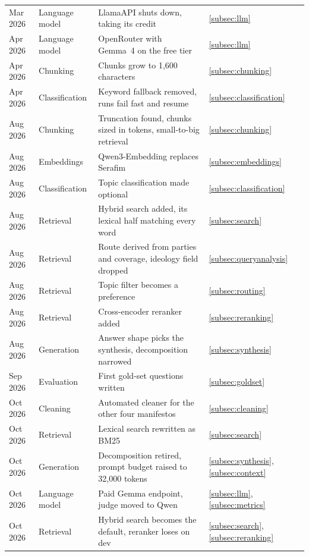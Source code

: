 \begin{table}[p]
\begin{tabular}{|l|l|p{}|l|}
        Mar 2026 & Language model & LlamaAPI shuts down, taking its credit & \ref{subsec:llm} \\
        Apr 2026 & Language model & OpenRouter with Gemma~4 on the free tier & \ref{subsec:llm} \\
        Apr 2026 & Chunking & Chunks grow to 1{,}600 characters & \ref{subsec:chunking} \\
        Apr 2026 & Classification & Keyword fallback removed, runs fail fast and resume & \ref{subsec:classification} \\
        Aug 2026 & Chunking & Truncation found, chunks sized in tokens, small-to-big retrieval & \ref{subsec:chunking} \\
        Aug 2026 & Embeddings & Qwen3-Embedding replaces Serafim & \ref{subsec:embeddings} \\
        Aug 2026 & Classification & Topic classification made optional & \ref{subsec:classification} \\
        Aug 2026 & Retrieval & Hybrid search added, its lexical half matching every word & \ref{subsec:search} \\
        Aug 2026 & Retrieval & Route derived from parties and coverage, ideology field dropped & \ref{subsec:queryanalysis} \\
        Aug 2026 & Retrieval & Topic filter becomes a preference & \ref{subsec:routing} \\
        Aug 2026 & Retrieval & Cross-encoder reranker added & \ref{subsec:reranking} \\
        Aug 2026 & Generation & Answer shape picks the synthesis, decomposition narrowed & \ref{subsec:synthesis} \\
        Sep 2026 & Evaluation & First gold-set questions written & \ref{subsec:goldset} \\
        Oct 2026 & Cleaning & Automated cleaner for the other four manifestos & \ref{subsec:cleaning} \\
        Oct 2026 & Retrieval & Lexical search rewritten as BM25 & \ref{subsec:search} \\
        Oct 2026 & Generation & Decomposition retired, prompt budget raised to 32{,}000 tokens & \ref{subsec:synthesis}, \ref{subsec:context} \\
        Oct 2026 & Language model & Paid Gemma endpoint, judge moved to Qwen & \ref{subsec:llm}, \ref{subsec:metrics} \\
        Oct 2026 & Retrieval & Hybrid search becomes the default, reranker loses on dev & \ref{subsec:search}, \ref{subsec:reranking} \\

\end{tabular}
\end{table}
